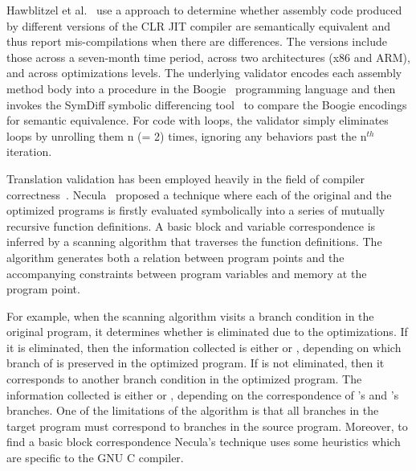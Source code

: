 Hawblitzel et al.~\cite{Hawblitzel:FSE2013} use a \tv approach to determine
whether assembly code produced by different versions of the CLR JIT compiler
are semantically equivalent and thus report mis-compilations when there are
differences. The versions include those across a seven-month time period,
  across two architectures (x86 and ARM), and across optimizations levels. The
  underlying validator encodes each assembly method body into a procedure in
  the Boogie~\cite{Boogie:2005}  programming language and then invokes the
  SymDiff symbolic differencing tool~\cite{SYMDIFF:2012} to compare the Boogie
  encodings for semantic equivalence. For code with loops, the validator simply
  eliminates loops by unrolling them n (= 2) times, ignoring any behaviors past
  the n$^{th}$ iteration.
 


Translation validation  has been employed heavily in the field of compiler
correctness~\cite{VOC2002,TVOC:CAV2005,Necula:2000}.  Necula~\cite{Necula:2000}
proposed a technique where each of the original and the optimized programs is
firstly evaluated symbolically into a series of mutually recursive function
definitions. A basic block and variable correspondence is inferred by a
scanning algorithm that traverses the function definitions. The algorithm
generates both a relation between program points and the accompanying
constraints between program variables and memory at the program point.  

For example, when the scanning
algorithm visits a branch condition  in the original program, it
determines whether  is eliminated due to the optimizations. If it is
eliminated, then the information collected is either  or , depending on which branch of  is preserved in the optimized program. 
%
If  is not eliminated, then it corresponds to another branch condition
 in the optimized program. The information collected is either 
or , depending on the correspondence of ’s and ’s
branches. One of the limitations of the algorithm is that all branches in the
target program must correspond to branches in the source program.   Moreover, to find
    a basic block correspondence Necula’s technique uses some heuristics which
    are specific to the GNU C compiler. 
  
